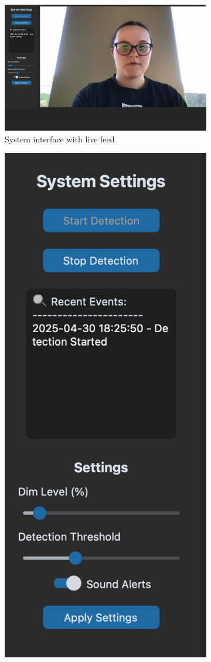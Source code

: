 \documentclass[12pt]{article}
\theoremstyle{plain}
\theoremstyle{definition}
\begin{document}
\begin{figure}[h!]
  \centering
  \begin{subfigure}[b]{0.45\textwidth}
    \centering
    \includegraphics[width=\linewidth]{img/gui.png}
    \caption{System interface with live feed}
    \label{fig:gui_face}
  \end{subfigure}
  \hfill
  \begin{subfigure}[c]{0.45\textwidth}
    \centering
    \includegraphics[width=0.6\linewidth]{img/sidebar.png}

\end{subfigure}
\end{figure}
\end{document}
